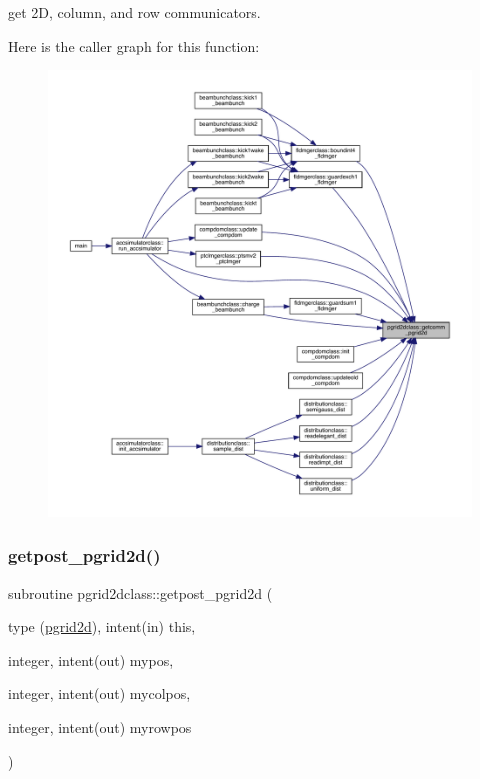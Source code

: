 get 2D, column, and row communicators. 

Here is the caller graph for this function\+:\nopagebreak
\begin{figure}[H]
\begin{center}
\leavevmode
\includegraphics[width=350pt]{namespacepgrid2dclass_a550cb1b5c94a9e168c3e0108bb8a6d5b_icgraph}
\end{center}
\end{figure}
\mbox{\label{namespacepgrid2dclass_a559d4550356f88440ae55fceda480de2}} 
\subsubsection{\texorpdfstring{getpost\_pgrid2d()}{getpost\_pgrid2d()}}
{\footnotesize\ttfamily subroutine pgrid2dclass\+::getpost\+\_\+pgrid2d (\begin{DoxyParamCaption}\item[{type (\mbox{\hyperlink{namespacepgrid2dclass_structpgrid2dclass_1_1pgrid2d}{pgrid2d}}), intent(in)}]{this,  }\item[{integer, intent(out)}]{mypos,  }\item[{integer, intent(out)}]{mycolpos,  }\item[{integer, intent(out)}]{myrowpos }\end{DoxyParamCaption})}



